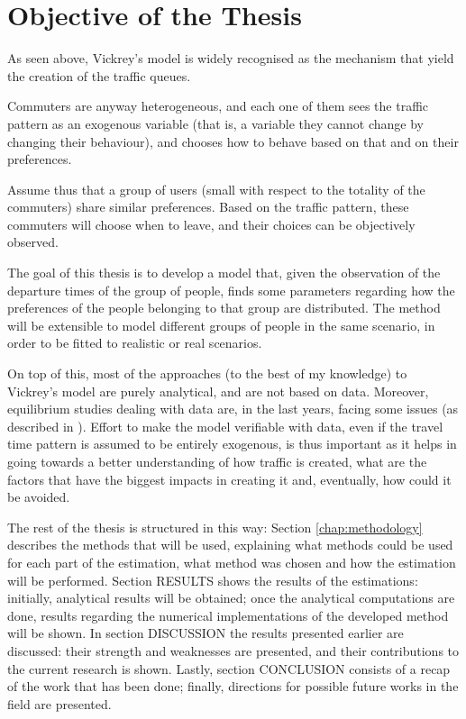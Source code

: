 \section{Objective of the Thesis}
\label{sec:thesis_obj}

As seen above,
Vickrey's model is widely recognised as the mechanism that yield the creation of the traffic queues.

Commuters are anyway heterogeneous,
and each one of them sees the traffic pattern as an exogenous variable
(that is, a variable they cannot change by changing their behaviour),
and chooses how to behave based on that and on their preferences.

Assume thus that a group of users (small with respect to the totality of the commuters) share similar preferences.
Based on the traffic pattern, these commuters will choose when to leave,
and their choices can be objectively observed.

The goal of this thesis is to develop a model that,
given the observation of the departure times of the group of people,
finds some parameters regarding how the preferences of the people belonging to that group are distributed.
The method will be extensible to model different groups of people in the same scenario,
in order to be fitted to realistic or real scenarios.

On top of this, most of the approaches (to the best of my knowledge) to Vickrey's model are purely analytical,
and are not based on data.
Moreover, equilibrium studies dealing with data are, in the last years, facing some issues (as described in \cite{https://doi.org/10.1111/iere.12692}).
Effort to make the model verifiable with data,
even if the travel time pattern is assumed to be entirely exogenous,
is thus important as it helps in going towards a better understanding of how traffic is created,
what are the factors that have the biggest impacts in creating it and, eventually,
how could it be avoided.

The rest of the thesis is structured in this way:
Section \ref{chap:methodology} describes the methods that will be used,
explaining what methods could be used for each part of the estimation,
what method was chosen and how the estimation will be performed.
Section RESULTS shows the results of the estimations:
initially, analytical results will be obtained;
once the analytical computations are done,
results regarding the numerical implementations of the developed method will be shown.
In section DISCUSSION the results presented earlier are discussed:
their strength and weaknesses are presented,
and their contributions to the current research is shown.
Lastly, section CONCLUSION consists of a recap of the work that has been done;
finally, directions for possible future works in the field are presented.

